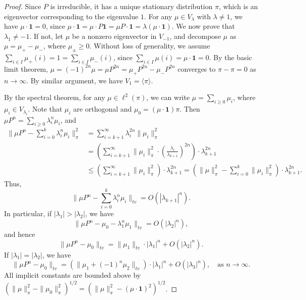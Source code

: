 \documentclass[a4]{amsart}
\theoremstyle{remark} \newtheorem{remark}[theorem]{Remark}
\begin{document}
\begin{proof}
Since $P$ is irreducible, it has a unique stationary distribution $\pi$, which is an eigenvector corresponding to the eigenvalue $1$. 
For any $\mu \in V_\lambda$ with $\lambda \neq 1$, we have $\mu \cdot \mathbf{1} = 0$, since $\mu \cdot \mathbf{1} = \mu \cdot P \mathbf{1} = \mu P \cdot \mathbf{1} = \lambda (\mu \cdot \mathbf{1})$. 
We now prove that $\lambda_1 \neq -1$. 
If not, let $\mu$ be a nonzero eigenvector in $V_{-1}$, and decompose $\mu$ as $\mu = \mu_+ - \mu_-$, where $\mu_\pm \geq 0$. 
Without loss of generality, we assume $\sum_{i \in I} \mu_+(i) = 1 = \sum_{i \in I} \mu_-(i)$, since $\sum_{i \in I} \mu(i) = \mu \cdot \mathbf{1} = 0$. 
By the basic limit theorem, $\mu = (-1)^{2n} \mu = \mu P^{2n} = \mu_+ P^{2n} - \mu_- P^{2n}$ converges to $\pi - \pi = 0$ as $n \to \infty$. 
By similar argument, we have $V_1 = \langle \pi \rangle$.

By the spectral theorem, for any $\mu \in \ell^2(\pi)$, we can write $\mu = \sum_{i \geq 0} \mu_i$, where $\mu_i \in V_{\lambda_i}$. Note that $\mu_i$ are orthogonal and $\mu_0 = (\mu \cdot \mathbf{1}) \pi$. Then $\mu P^n = \sum_{i \geq 0} \lambda_i^n \mu_i$, and
\[
\begin{split}
\|\mu P^n - \sum_{i=0}^{k} \lambda_i^n \mu_i\|_\pi^2 &= \sum_{i=k+1}^{\infty} \lambda_i^{2n} \|\mu_i\|_\pi^2 \\
&= \left(\sum_{i=k+1}^\infty \|\mu_i\|_\pi^2 \cdot \left(\frac{\lambda_i}{\lambda_{k+1}}\right)^{2n} \right) \cdot \lambda_{k+1}^{2n} \\
&\leq \left(\sum_{i=k+1}^\infty \|\mu_i\|_\pi^2 \right) \cdot \lambda_{k+1}^{2n}=(\|\mu\|_\pi^2 - \sum_{i=0}^{k} \|\mu_i\|_\pi^2) \cdot \lambda_{k+1}^{2n}.
\end{split}
\]
Thus,
\[
\|\mu P^n - \sum_{i=0}^{k} \lambda_i^n \mu_i\|_{tv} = O(|\lambda_{k+1}|^{n}).
\]
In particular, if $|\lambda_1| > |\lambda_2|$, we have
\[
\|\mu P^n - \mu_0 - \lambda_1^n \mu_1\|_{tv} = O(|\lambda_2|^{n}),
\]
and hence
\[
\|\mu P^n - \mu_0\|_{tv} = \|\mu_1\|_{tv} \cdot |\lambda_1|^{n} + O(|\lambda_2|^{n}).
\]
If $|\lambda_1| = |\lambda_2|$, we have
\[
\|\mu P^n - \mu_0\|_{tv} = (\|\mu_1 + (-1)^n \mu_2\|_{tv}) \cdot |\lambda_1|^{n} + O(|\lambda_3|^{n}), \quad \text{as } n \to \infty.
\]
All implicit constants are bounded above by $(\|\mu\|_\pi^2 - \|\mu_0\|_\pi^2)^{1/2} = (\|\mu\|_\pi^2 - (\mu \cdot \mathbf{1})^2)^{1/2}$.
\end{proof}

   
\end{document}

